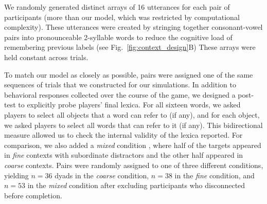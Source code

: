 We randomly generated distinct arrays of 16 utterances for each pair of participants (more than our model, which was restricted by computational complexity).
These utterances were created by stringing together consonant-vowel pairs into pronounceable 2-syllable words to reduce the cognitive load of remembering previous labels (see Fig.\ \ref{fig:context_design}B)
These arrays were held constant across trials.

To match our model as closely as possible, pairs were assigned one of the same sequences of trials that we constructed for our simulations. 
In addition to behavioral responses collected over the course of the game, we designed a post-test to explicitly probe players' final lexica. For all sixteen words, we asked players to select all objects that a word can refer to (if any), and for each object, we asked players to select all words that can refer to it (if any). 
This bidirectional measure allowed us to check the internal validity of the lexica reported.
For comparison, we also added a \emph{mixed} condition , where half of the targets appeared in \emph{fine} contexts with subordinate distractors and the other half appeared in \emph{coarse} contexts.
Pairs were randomly assigned to one of three different conditions, yielding $n=36$ dyads in the \emph{coarse} condition, $n=38$ in the \emph{fine} condition, and $n=53$ in the \emph{mixed} condition after excluding participants who disconnected before completion.

